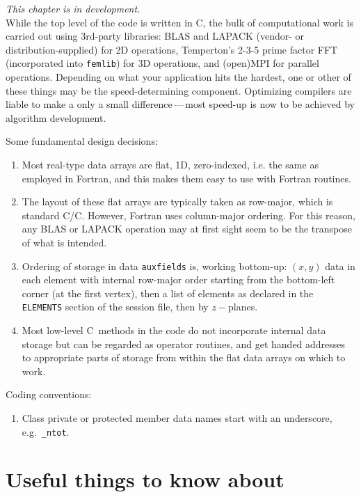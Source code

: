 \documentclass[11pt]{report}
\newcommand{\eg}{e.g.\ } \newcommand{\CC}{\mathrm{c.c.}}
\newcommand\cpp{C\nolinebreak\hspace{-.05em}\raisebox{.3ex}{\footnotesize\bf
+}\nolinebreak\hspace{-.10em}\raisebox{.3ex}{\footnotesize\bf+}}
\begin{document}
\textsl{This chapter is in development.}\\


While the top level of the code is written in \cpp, the bulk of
computational work is carried out using 3rd-party libraries: BLAS and
LAPACK (vendor- or distribution-supplied) for 2D operations,
Temperton's 2-3-5 prime factor FFT (incorporated into \texttt{femlib})
for 3D operations, and (open)MPI for parallel operations.  Depending
on what your application hits the hardest, one or other of these
things may be the speed-determining component. Optimizing compilers
are liable to make a only a small difference\,---\,most speed-up is
now to be achieved by algorithm development.

Some fundamental design decisions:
\begin{enumerate}
\item
Most real-type data arrays are flat, 1D, zero-indexed, i.e. the same
as employed in Fortran, and this makes them easy to use with Fortran
routines.
\item
The layout of these flat arrays are typically taken as row-major,
which is standard C/\cpp. However, Fortran uses column-major
ordering. For this reason, any BLAS or LAPACK operation may at first
sight seem to be the transpose of what is intended.
\item
Ordering of
storage in data \verb|auxfields| is, working bottom-up: $(x,y)$ data
in each element with internal row-major order starting from the
bottom-left corner (\ie at the first vertex), then a list of elements
as declared in the \verb|ELEMENTS| section of the session file, then
by $z-$planes.
\item
Most low-level \cpp\ methods in the code do not incorporate internal
data storage but can be regarded as operator routines, and get handed
addresses to appropriate parts of storage from within the flat data
arrays on which to work.
\end{enumerate}

Coding conventions:
\begin{enumerate}
\item
Class private or protected member data names start with an underscore,
\eg \texttt{\_ntot}.
\end{enumerate}

\section{Useful things to know about}
\end{document}
